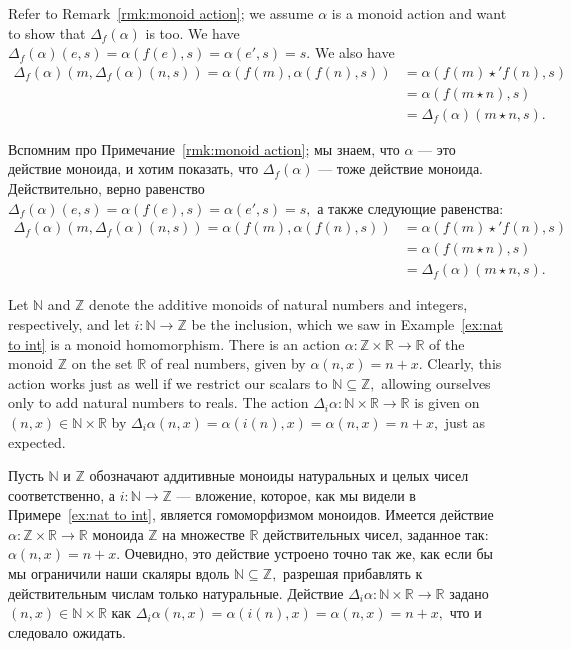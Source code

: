 \documentclass[../main/CT4S-EN-RU]{subfiles}
\begin{document}
\begin{proofENG}
Refer to Remark~\ref{rmk:monoid action}; we assume $\alpha$ is a monoid action and want to show that ${Δ}_f(\alpha)$ is too. We have ${Δ}_f(\alpha)(e,s)=\alpha(f(e),s)=\alpha(e',s)=s.$ We also have
\begin{align*}
{Δ}_f(\alpha)(m,{Δ}_f(\alpha)(n,s))=\alpha(f(m),\alpha(f(n),s))&=\alpha(f(m){⋆}' f(n),s)\\
&=\alpha(f(m{⋆} n),s)\\
&={Δ}_f(\alpha)(m{⋆} n,s).
\end{align*}
\end{proofENG}

\begin{proofRUS}
Вспомним про Примечание~\ref{rmk:monoid action}; мы знаем, что $\alpha$ — это действие моноида, и хотим показать, что ${Δ}_f(\alpha)$ — тоже действие моноида. Действительно, верно равенство ${Δ}_f(\alpha)(e,s)=\alpha(f(e),s)=\alpha(e',s)=s,$ а также следующие равенства:
\begin{align*}
{Δ}_f(\alpha)(m,{Δ}_f(\alpha)(n,s))=\alpha(f(m),\alpha(f(n),s))&=\alpha(f(m){⋆}' f(n),s)\\
&=\alpha(f(m{⋆} n),s)\\
&={Δ}_f(\alpha)(m{⋆} n,s).
\end{align*}
\end{proofRUS}

\begin{exampleENG}
Let ${ℕ}$ and ${ℤ}$ denote the additive monoids of natural numbers and integers, respectively, and let $i\colon{ℕ}{→}{ℤ}$ be the inclusion, which we saw in Example~\ref{ex:nat to int} is a monoid homomorphism. There is an action $\alpha\colon{ℤ}\times{ℝ}{→}{ℝ}$ of the monoid ${ℤ}$ on the set ${ℝ}$ of real numbers, given by $\alpha(n,x)=n+x.$ Clearly, this action works just as well if we restrict our scalars to ${ℕ}\subseteq{ℤ},$ allowing ourselves only to add natural numbers to reals. The action ${Δ}_i\alpha\colon{ℕ}\times{ℝ}{→}{ℝ}$ is given on $(n,x)\in{ℕ}\times{ℝ}$ by ${Δ}_i\alpha(n,x)=\alpha(i(n),x)=\alpha(n,x)=n+x,$ just as expected.
\end{exampleENG}

\begin{exampleRUS}
Пусть ${ℕ}$ и ${ℤ}$ обозначают аддитивные моноиды натуральных и целых чисел соответственно, а $i\colon{ℕ}{→}{ℤ}$ — вложение, которое, как мы видели в Примере~\ref{ex:nat to int}, является гомоморфизмом моноидов. Имеется действие $\alpha\colon{ℤ}\times{ℝ}{→}{ℝ}$ моноида ${ℤ}$ на множестве ${ℝ}$ действительных чисел, заданное так: $\alpha(n,x)=n+x.$ Очевидно, это действие устроено точно так же, как если бы мы ограничили наши скаляры вдоль ${ℕ}\subseteq{ℤ},$ разрешая прибавлять к действительным числам только натуральные. Действие ${Δ}_i\alpha\colon{ℕ}\times{ℝ}{→}{ℝ}$ задано $(n,x)\in{ℕ}\times{ℝ}$ как ${Δ}_i\alpha(n,x)=\alpha(i(n),x)=\alpha(n,x)=n+x,$ что и следовало ожидать.
\end{exampleRUS}
\end{document}
